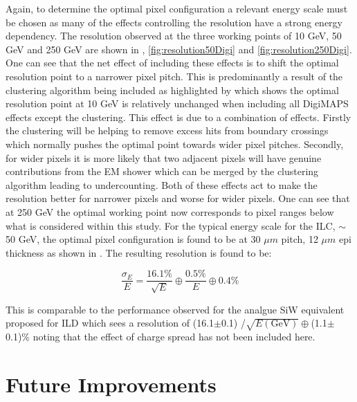 Again, to determine the optimal pixel configuration a relevant energy scale must be chosen as many of the effects controlling the resolution have a strong energy dependency. The resolution observed at the three working points of 10 GeV, 50 GeV and 250 GeV are shown in , \ref{fig:resolution50Digi} and \ref{fig:resolution250Digi}. One can see that the net effect of including these effects is to shift the optimal resolution point to a narrower pixel pitch. This is predominantly a result of the clustering algorithm being included as highlighted by  which shows the optimal resolution point at 10 GeV is relatively unchanged when including all DigiMAPS effects except the clustering. This effect is due to a combination of effects. Firstly the clustering will be helping to remove excess hits from boundary crossings which normally pushes the optimal point towards wider pixel pitches. Secondly, for wider pixels it is more likely that two adjacent pixels will have genuine contributions from the EM shower which can be merged by the clustering algorithm leading to undercounting. Both of these effects act to make the resolution better for narrower pixels and worse for wider pixels. One can see that at 250 GeV the optimal working point now corresponds to pixel ranges below what is considered within this study. For the typical energy scale for the \ac{ILC}, $\sim$50 GeV, the optimal pixel configuration is found to be at 30 $\mu m$ pitch, 12 $\mu m$ epi thickness as shown in . The resulting resolution is found to be:

\begin{equation}
  \frac{\sigma_E}{E}=\frac{16.1\%}{\sqrt{E}} \oplus \frac{0.5\%}{E} \oplus 0.4\%
\end{equation}

This is comparable to the performance observed for the analgue SiW equivalent proposed for \ac{ILD} which sees a resolution of (16.1$\pm$0.1) /$\sqrt{E(\text{GeV})} \oplus$(1.1$\pm$0.1)\% noting that the effect of charge spread has not been included here.


\section{Future Improvements}

